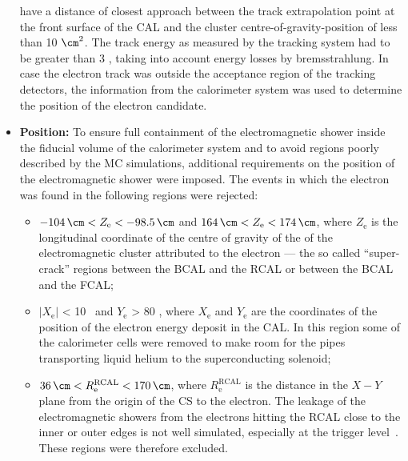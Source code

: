 \begin{itemize}
	have a distance of closest approach between the track extrapolation point at the front surface of the CAL and the cluster centre-of-gravity-position of less than 10 $\cm^2$. The track energy as measured by the tracking system had to be greater than 3 \GeV, taking into account energy losses by bremsstrahlung. In case the electron track was outside the acceptance region of the tracking detectors, the information from the calorimeter system was used to determine the position of the electron candidate.
	\item \textbf{Position:} To ensure full containment of the electromagnetic shower inside the fiducial volume of the calorimeter system and to avoid regions poorly described by the MC simulations, additional requirements on the position of the electromagnetic shower were imposed. The events in which the electron was found in the following regions were rejected:
	\begin{itemize}
		\item $ -104\, \cm < Z_\text{e} < -98.5\, \cm	$ and $ 164\, \cm < Z_\text{e} < 174\, \cm $, where $Z_\text{e}$ is the longitudinal coordinate of the centre of gravity of the of the electromagnetic cluster attributed to the electron --- the so called ``super-crack'' regions between the BCAL and the RCAL or between the BCAL and the FCAL;
		\item $\left| X_\text{e} \right|$ < 10 \cm\, and $Y_\text{e}$ > 80 \cm, where $X_\text{e}$ and $Y_\text{e}$ are the coordinates of the position of the electron energy deposit in the CAL. In this region some of the calorimeter cells were removed to make room for the  pipes transporting  liquid helium to the superconducting solenoid;
		\item $ 36\, \cm < R^\text{RCAL}_\text{e} < 170\, \cm $, where $R^\text{RCAL}_\text{e}$ is the distance in the $X-Y$ plane from the origin of the \zeus CS to the electron. The leakage of the electromagnetic showers from the electrons hitting the RCAL close to the inner or outer edges is not well simulated, especially at the trigger level~\cite{thesis:januschek:2011}. These regions were therefore excluded. 
	\end{itemize}
\end{itemize}

